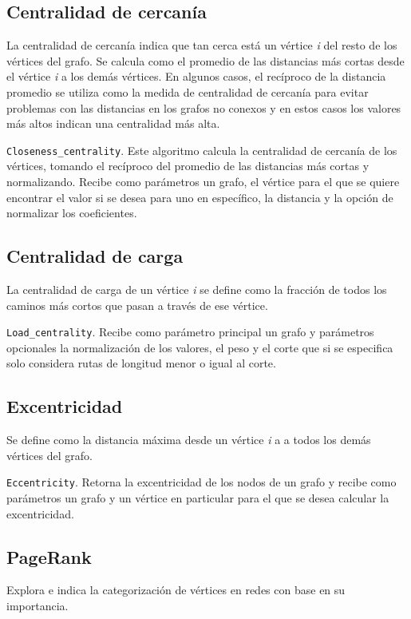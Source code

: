 \documentclass{article}
\begin{document}
\subsection*{Centralidad de cercanía}
La centralidad de cercanía indica que tan cerca está un vértice \textit{i} del resto de los vértices del grafo. Se calcula como el promedio de las distancias más cortas desde el vértice  \textit{i} a los demás vértices. En algunos casos, el recíproco de la distancia promedio se utiliza como la medida de centralidad de cercanía para evitar problemas con las distancias en los grafos no conexos y en estos casos los valores más altos indican una centralidad más alta. 

\texttt{Closeness\_centrality}. Este algoritmo calcula la centralidad de cercanía de los vértices, tomando el recíproco del promedio de las distancias más cortas y normalizando. Recibe como parámetros un grafo, el vértice para el que se quiere encontrar el valor si se desea para uno en específico, la distancia y la opción de normalizar los coeficientes. 
   
\subsection*{Centralidad de carga}
La centralidad de carga de un vértice \textit{i} se define como la fracción de todos los caminos más cortos que pasan a través de ese vértice.  

\texttt{Load\_centrality}. Recibe como parámetro principal un grafo y parámetros opcionales la normalización de los valores, el peso y el corte que si se especifica solo considera rutas de longitud menor o igual al corte. 

\subsection*{Excentricidad}
Se define como la distancia máxima desde un vértice \textit{i} a a todos los demás vértices del grafo. 

\texttt{Eccentricity}. Retorna la excentricidad de los nodos de un grafo y recibe como parámetros un grafo y un vértice en particular para el que se desea calcular la excentricidad. 
  
\subsection*{PageRank}
Explora e indica la categorización de vértices en redes con base en su importancia.
\end{document}

